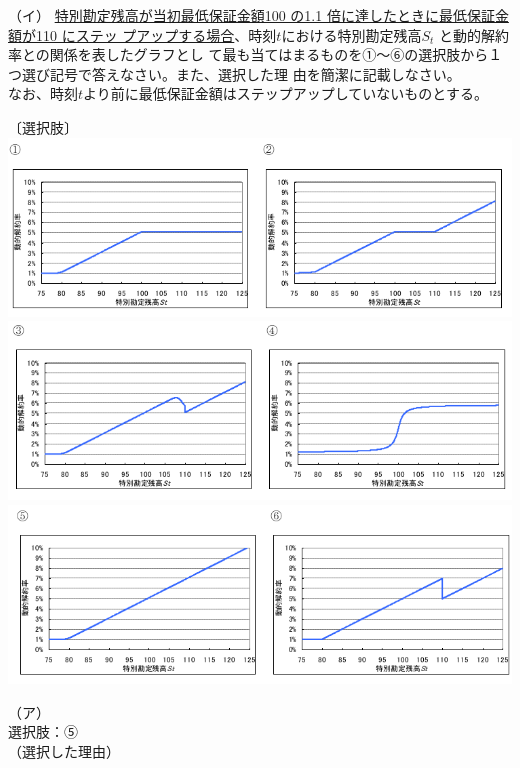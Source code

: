 \documentclass[report,gutter=10mm,fore-edge=10mm,uplatex,dvipdfmx]{jlreq}
\begin{document}
（イ） \underline{特別勘定残高が当初最低保証金額100 の1.1 倍に達したときに最低保証金額が110 にステッ
プアップする場合}、時刻$t$における特別勘定残高$S_t$ と動的解約率との関係を表したグラフとし
て最も当てはまるものを①～⑥の選択肢から１つ選び記号で答えなさい。また、選択した理
由を簡潔に記載しなさい。\\
なお、時刻$t$より前に最低保証金額はステップアップしていないものとする。

〔選択肢〕\\
\includegraphics[scale=0.6]{images/ProbH24-1-2-2-1+2.png}\\
\includegraphics[scale=0.6]{images/ProbH24-1-2-2-3+4.png}\\
\includegraphics[scale=0.6]{images/ProbH24-1-2-2-5+6.png}

\answer{}
\noindent（ア）\\
選択肢：⑤\\
（選択した理由）
\end{document}
